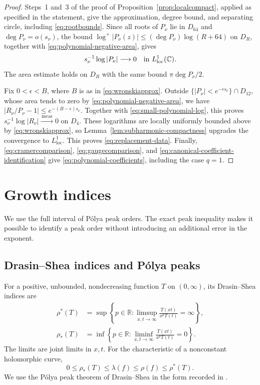 \documentclass[11pt,letterpaper,reqno]{amsart}
\theoremstyle{remark}
\numberwithin{equation}{section}
\newcommand{\C}{\mathbb C}
\newcommand{\R}{\mathbb R}
\newcommand{\loc}{\mathrm{loc}}
\newcommand{\convmeas}{\xrightarrow{\,\mathrm{meas}\,}}
\begin{document}
\begin{proof}
Steps~1 and~3 of the proof of Proposition~\ref{prop:localcompact},
applied as specified in the statement, give the approximation, degree
bound, and separating circle, including \eqref{eq:rootbounds}. Since all roots of $P_\nu$ lie in $D_{64}$ and
$\deg P_\nu=o(s_\nu)$, the bound
$\log^+|P_\nu(z)|\le(\deg P_\nu)\log(R+64)$ on $D_R$, together with
\eqref{eq:polynomial-negative-area}, gives
\begin{equation}\label{eq:small-polynomial-log}
 s_\nu^{-1}\log|P_\nu|\longrightarrow0
 \quad\hbox{in }L^1_{\loc}(\C).
\end{equation}
The area estimate holds on $D_R$ with the same bound $\pi\deg P_\nu/2$.

Fix $0<\epsilon<B$, where $B$ is as in \eqref{eq:wronskiapprox}.
Outside $\{|P_\nu|<e^{-\epsilon s_\nu}\}\cap D_{12}$, whose area tends to
zero by \eqref{eq:polynomial-negative-area}, we have
$|R_\nu/P_\nu-1|\le e^{-(B-\epsilon)s_\nu}$.
Together with \eqref{eq:small-polynomial-log}, this proves
$s_\nu^{-1}\log|R_\nu|\convmeas0$ on $D_4$.
These logarithms are locally uniformly bounded above by
\eqref{eq:wronskiapprox}, so Lemma~\ref{lem:subharmonic-compactness} upgrades
the convergence to $L^1_{\loc}$. This proves \eqref{eq:replacement-data}.
Finally, \eqref{eq:cramercomparison}, \eqref{eq:gaugecomparison}, and
\eqref{eq:canonical-coefficient-identification} give
\eqref{eq:polynomial-coefficients}, including the case $q=1$.
\end{proof}

\section{Growth indices}\label{sec:indices}

We use the full interval of P\'olya peak orders. The exact peak inequality
makes it possible to identify a peak order without introducing an additional
error in the exponent.

\subsection{Drasin--Shea indices and P\'olya peaks}

For a positive, unbounded, nondecreasing function $T$ on $(0,\infty)$,
its Drasin--Shea
indices \cite{DS72} are
\begin{equation}\label{eq:strong-indices}
 \begin{split}
 \rho^*(T)&=\sup\left\{p\in\R:
       \limsup_{x,t\to\infty}\frac{T(xt)}{x^pT(t)}=\infty\right\},\\
 \rho_*(T)&=\inf\left\{p\in\R:
       \liminf_{x,t\to\infty}\frac{T(xt)}{x^pT(t)}=0\right\}.
 \end{split}
\end{equation}
The limits are joint limits in $x,t$. For the characteristic of a
nonconstant holomorphic curve,
\begin{equation}\label{eq:index-order-bounds}
 0\le\rho_*(T)\le\lambda(f)\le\rho(f)\le\rho^*(T).
\end{equation}
We use the P\'olya peak theorem of Drasin--Shea \cite{DS72} in the form
recorded in \cite[p.~1203]{Ere93}.
\end{document}
